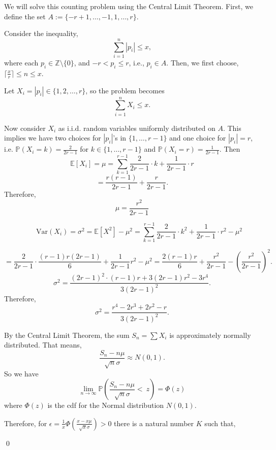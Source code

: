 \documentclass[11pt]{amsart}
\renewenvironment{proof}{{\bfseries Proof.}}{\qed}
\numberwithin{equation}{section}
\numberwithin{equation}{section}
\begin{document}
		 \begin{proof}
		 	We will solve this counting problem using the Central Limit Theorem. First, we define the set $A:=\{-r+1,\dots,-1,1,\dots,r\}$.
		 	
		 	
		 	
		 	
		 	Consider the inequality,
		 	\begin{equation} \label{eq:main}
		 		\sum_{i=1}^{n} |p_i| \leq x,
		 	\end{equation}
		 	where each \( p_i \in \mathbb{Z} \setminus \{0\} \), and \( -r < p_i \leq r \), i.e., \( p_i \in A \). Then, we first choose, $\lceil\frac{x}{r}\rceil \leq n\leq x. $
		 	
		 	Let \( X_i = |p_i| \in \{1, 2, \dots, r\} \), so the problem becomes
		 	\[
		 	\sum_{i=1}^n X_i \leq x.
		 	\]
		 	
		 	Now consider \( X_i \) as i.i.d. random variables uniformly distributed on \(A \). This implies we have two choices for $|p_i|$'s in $\{1,\dots,r-1\}$ and one choice for $|p_i|=r$, i.e. $\mathbb{P}(X_{i}=k)=\frac{2}{2r-1}$ for $k\in \{1,\dots,r-1\}$ and $\mathbb{P}(X_{i}=r)=\frac{1}{2r-1}$. Then
		 	\[
		 	\mathbb{E}[X_i] = \mu = \sum_{k=1}^{r-1} \frac{2}{2r-1}\cdot k +\frac{1}{2r-1}\cdot r
		 	\]
		 	\[=\frac{r(r-1)}{2r-1}+\frac{r}{2r-1}.\]
		 Therefore,	\[{\mu=\frac{r^{2}}{2r-1}}\]
		 	
		 	
		 	
		 	
		 	
		 	
		 	\[ \qquad \mathrm{Var}(X_i) = \sigma^2 = \mathbb{E}[X^{2}]-\mu^{2}=\sum_{k=1}^{r-1} \frac{2}{2r-1}\cdot k^{2} +\frac{1}{2r-1}\cdot r^{2}-\mu^{2}\]
		 	
		 	\[
		 	= \frac{2}{2r - 1} \cdot \frac{(r-1)r(2r - 1)}{6} + \frac{1}{2r - 1} r^2 -\mu^{2}= \frac{2(r - 1)r}{6} + \frac{r^2}{2r - 1}-\left( \frac{r^2}{2r - 1} \right)^2.
		 	\]
		 	\[
		 	\sigma^{2}= \frac{(2r - 1)^2 \cdot (r - 1)r + 3(2r - 1)r^2 - 3r^4}{3(2r - 1)^2}.
		 	\]
		 	Therefore,
		 	\[
		 	{
		 		\sigma^{2}=\frac{r^4 - 2r^3 + 2r^2 - r}{3(2r - 1)^2}.
		 	}
		 	\]
		 	
		 	
		 	
		 	By the Central Limit Theorem, the sum \( S_n = \sum X_i \) is approximately normally distributed. That means,
		 	\[
		 	\frac{S_n -n\mu}{\sqrt{n}\sigma}\approx {N}(0,1).
		 	\]
		 	So we have \[\lim_{n\rightarrow\infty}\mathbb{P}\left(\frac{S_n -n\mu}{\sqrt{n}\sigma}<~z\right)=\Phi(z)\]
		 	where $\Phi(z)$ is the cdf for the Normal distribution  $N(0,1).$ 
		 	
		 	Therefore, for $\epsilon=\frac{1}{x}{\Phi\left(\frac{x-x\mu}{\sqrt{x}\sigma}\right)}>0$ there is a natural number $K$ such that,
		 	

\end{proof}
\end{document}

